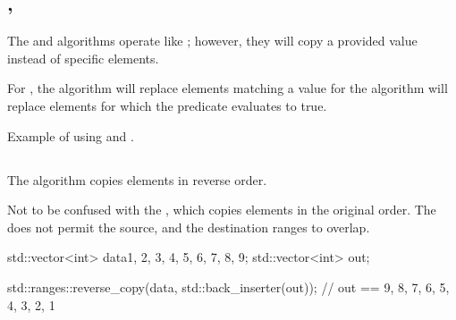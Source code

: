 \subsection{\texorpdfstring{, }{\texttt{std::replace\_copy}, \texttt{std::replace\_copy\_if}}}

The  and  algorithms operate like ; however, they will copy a provided value instead of specific elements.

For , the algorithm will replace elements matching a value for  the algorithm will replace elements for which the predicate evaluates to true.


\begin{box-note}
\footnotesize Example of using  and .
\tcblower
{}
\end{box-note}

\subsection{\texorpdfstring{}{\texttt{std::reverse\_copy}}}

The  algorithm copies elements in reverse order.


Not to be confused with the , which copies elements in the original order. The  does not permit the source, and the destination ranges to overlap.

\begin{box-note}
\begin{cppcode}
std::vector<int> data{1, 2, 3, 4, 5, 6, 7, 8, 9};
std::vector<int> out;

std::ranges::reverse_copy(data, std::back_inserter(out));
// out == { 9, 8, 7, 6, 5, 4, 3, 2, 1 }
\end{cppcode}
\end{box-note}

